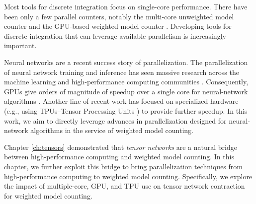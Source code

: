 Most tools for discrete integration focus on single-core performance. 
There have been only a few parallel counters, notably the multi-core unweighted model counter  \cite{BSB15} and the GPU-based weighted model counter  \cite{FHWZ18,FHZ19}.
Developing tools for discrete integration that can leverage available parallelism is increasingly important. %


Neural networks are a recent success story of parallelization. The parallelization of neural network training and inference has seen massive research across the machine learning and high-performance computing communities \cite{ABCCDDDGII16,JYPPABBBBB17,PGMLJGKLGA19}. Consequently, GPUs give orders of magnitude of speedup over a single core for neural-network algorithms \cite{KSTKPPRS19,NRBHHJN15}. 
Another line of recent work has focused on specialized hardware (e.g., using TPUs--Tensor Processing Units \cite{JYPPABBBBB17}) to provide further speedup.
In this work, we aim to directly leverage advances in parallelization designed for neural-network algorithms in the service of weighted model counting. %

Chapter \ref{ch:tensors} demonstrated that \emph{tensor networks} are a natural bridge between high-performance computing and weighted model counting.
In this chapter, we further exploit this bridge to bring parallelization techniques from high-performance computing to weighted model counting. Specifically, we explore the impact of multiple-core, GPU, and TPU use on tensor network contraction for weighted model counting.

